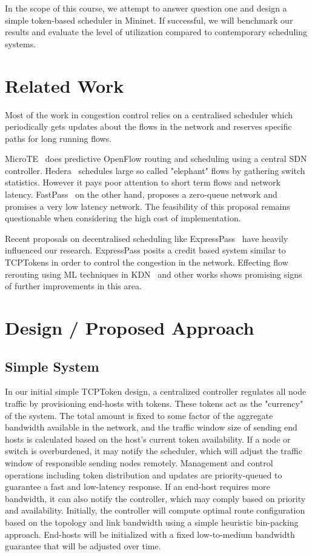 \documentclass[sigconf]{acmart}
\begin{document}
In the scope of this course, we attempt to answer question one and design a simple token-based scheduler in Mininet. If successful, we will benchmark our results and evaluate the level of utilization compared to contemporary scheduling systems.

\section{Related Work}
\label{sec:related}

Most of the work in congestion control relies on a centralised scheduler which periodically gets updates about the flows in the network and reserves specific paths for long running flows.

MicroTE~\cite{microte} does predictive OpenFlow routing and scheduling using a central SDN controller. Hedera~\cite{hedera} schedules large so called "elephant" flows by gathering switch statistics. However it pays poor attention to short term flows and network latency. FastPass~\cite{fastpass} on the other hand, proposes a zero-queue network and promises a very low latency network. The feasibility of this proposal remains questionable when considering the high cost of implementation.

Recent proposals on decentralised scheduling like ExpressPass~\cite{expresspass} have heavily influenced our research. ExpressPass posits a credit based system similar to TCPTokens in order to control the congestion in the network. Effecting flow rerouting using ML techniques in KDN~\cite{kdn} and other works shows promising signs of further improvements in this area.

\section{Design / Proposed Approach}
\label{sec:design}

\subsection{Simple System}
In our initial simple TCPToken design, a centralized controller regulates all node traffic by provisioning end-hosts with tokens.
These tokens act as the "currency" of the system. The total amount is fixed to some factor of the aggregate bandwidth available in the network, and the traffic window size of sending end hosts is calculated based on the host’s current token availability. If a node or switch is overburdened, it may notify the scheduler, which will adjust the traffic window of responsible sending nodes remotely. Management and control operations including token distribution and updates are priority-queued to guarantee a fast and low-latency response. If an end-host requires more bandwidth, it can also notify the controller, which may comply based on priority and availability.
Initially, the controller will compute optimal route configuration based on the topology and link bandwidth using a simple heuristic bin-packing approach. End-hosts will be initialized with a fixed low-to-medium bandwidth guarantee that will be adjusted over time.
\end{document}
